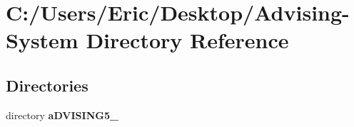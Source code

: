 \section{C\+:/\+Users/\+Eric/\+Desktop/\+Advising-\/\+System Directory Reference}
\label{dir_3a2fe4d6cbd977ad6b6819eb0c5e874d}
\subsection*{Directories}
\begin{DoxyCompactItemize}
\item 
directory {\bf a\+D\+V\+I\+S\+I\+N\+G5\+\_}
\end{DoxyCompactItemize}
